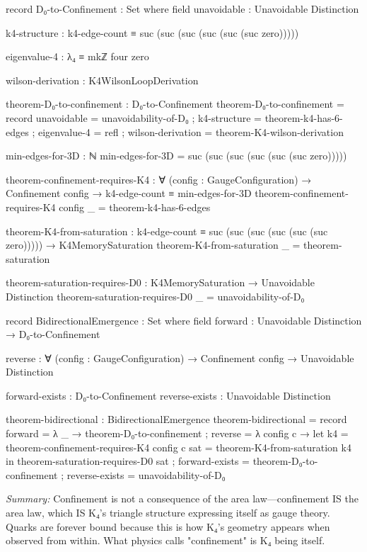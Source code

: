 \documentclass[11pt,a4paper]{book}
\begin{document}
\begin{code}
record D₀-to-Confinement : Set where
  field
    unavoidable : Unavoidable Distinction
    
    k4-structure : k4-edge-count ≡ suc (suc (suc (suc (suc (suc zero)))))
    
    eigenvalue-4 : λ₄ ≡ mkℤ four zero
    
    wilson-derivation : K4WilsonLoopDerivation

theorem-D₀-to-confinement : D₀-to-Confinement
theorem-D₀-to-confinement = record
  { unavoidable  = unavoidability-of-D₀
  ; k4-structure = theorem-k4-has-6-edges
  ; eigenvalue-4 = refl
  ; wilson-derivation = theorem-K4-wilson-derivation
  }

min-edges-for-3D : ℕ
min-edges-for-3D = suc (suc (suc (suc (suc (suc zero)))))

theorem-confinement-requires-K4 : ∀ (config : GaugeConfiguration) →
  Confinement config → 
  k4-edge-count ≡ min-edges-for-3D
theorem-confinement-requires-K4 config _ = theorem-k4-has-6-edges

theorem-K4-from-saturation : 
  k4-edge-count ≡ suc (suc (suc (suc (suc (suc zero))))) →
  K4MemorySaturation
theorem-K4-from-saturation _ = theorem-saturation

theorem-saturation-requires-D0 : K4MemorySaturation → Unavoidable Distinction
theorem-saturation-requires-D0 _ = unavoidability-of-D₀

record BidirectionalEmergence : Set where
  field
    forward : Unavoidable Distinction → D₀-to-Confinement
    
    reverse : ∀ (config : GaugeConfiguration) → 
              Confinement config → Unavoidable Distinction
    
    forward-exists : D₀-to-Confinement
    reverse-exists : Unavoidable Distinction

theorem-bidirectional : BidirectionalEmergence
theorem-bidirectional = record
  { forward   = λ _ → theorem-D₀-to-confinement
  ; reverse   = λ config c → 
      let k4 = theorem-confinement-requires-K4 config c
          sat = theorem-K4-from-saturation k4
      in theorem-saturation-requires-D0 sat
  ; forward-exists = theorem-D₀-to-confinement
  ; reverse-exists = unavoidability-of-D₀
  }
\end{code}

\medskip
\noindent\textit{Summary:} Confinement is not a consequence of the area law—confinement IS the area law, which IS K₄'s triangle structure expressing itself as gauge theory. Quarks are forever bound because this is how K₄'s geometry appears when observed from within. What physics calls "confinement" is K₄ being itself.
\end{document}

